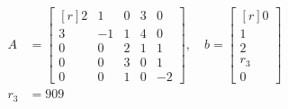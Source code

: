 \grupo{}

\begin{align*}
	A &=
	\begin{bmatrix*}[r]
		2 & 1 & 0 & 3 & 0\\
		3 & -1 & 1 & 4 & 0\\
		0 & 0 & 2 & 1 & 1\\
		0 & 0 & 3 & 0 & 1\\
		0 & 0 & 1 & 0 & -2
	\end{bmatrix*},
	\quad
	b =
	\begin{bmatrix*}[r]
		0\\
		1\\
		2\\
		r_3\\
		0
	\end{bmatrix*}\\
	r_3 &= 909
\end{align*}


